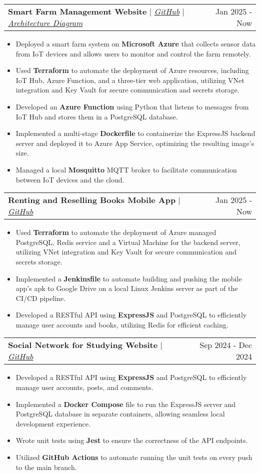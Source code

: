 \documentclass[letterpaper,11pt]{article}
\makeatletter
\newcommand{\resumeItem}[1]{
  \item\small{
    {#1 \vspace{-2pt}}
  }
}
\newcommand{\resumeProjectHeading}[2]{
    \vspace{-2pt}\item
    \begin{tabular*}{0.97\textwidth}{l@{\extracolsep{\fill}}r}
      #1 & \small#2 \\
    \end{tabular*}\vspace{-7pt}
}
\newcommand{\resumeItemListStart}{\begin{itemize}}
\newcommand{\resumeItemListEnd}{\end{itemize}\vspace{-5pt}}
\makeatother
\begin{document}
      \resumeProjectHeading
        {\textbf{Smart Farm Management Website} $|$ \emph{\href{https://github.com/kng1259/IOT-project}{GitHub}} $|$ \emph{\href{https://drive.google.com/file/d/1R50MEnKQcrV0OXfp1K20jsz2jnyDsDmk/view?usp=sharing}{Architecture Diagram}}}{Jan 2025 - Now}
          \resumeItemListStart
            \resumeItem{Deployed a smart farm system on \textbf{Microsoft Azure} that collects sensor data from IoT devices and allows users to monitor and control the farm remotely.}
            \resumeItem{Used \textbf{Terraform} to automate the deployment of Azure resources, including IoT Hub, Azure Function, and a three-tier web application, utilizing VNet integration and Key Vault for secure communication and secrets storage.}
            \resumeItem{Developed an \textbf{Azure Function} using Python that listens to messages from IoT Hub and stores them in a PostgreSQL database.}
            \resumeItem{Implemented a multi-stage \textbf{Dockerfile} to containerize the ExpressJS backend server and deployed it to Azure App Service, optimizing the resulting image's size.}
            \resumeItem{Managed a local \textbf{Mosquitto} MQTT broker to facilitate communication between IoT devices and the cloud.}
          \resumeItemListEnd
      
      \resumeProjectHeading
        {\textbf{Renting and Reselling Books Mobile App} $|$ \emph{\href{https://github.com/btram11/Mobile-242}{GitHub}}}{Jan 2025 - Now}
          \resumeItemListStart
            \resumeItem{Used \textbf{Terraform} to automate the deployment of Azure managed PostgreSQL, Redis service and a Virtual Machine for the backend server, utilizing VNet integration and Key Vault for secure communication and secrets storage.}
            \resumeItem{Implemented a \textbf{Jenkinsfile} to automate building and pushing the mobile app's apk to Google Drive on a local Linux Jenkins server as part of the CI/CD pipeline.}
            \resumeItem{Developed a {RESTful API} using \textbf{ExpressJS} and PostgreSQL to efficiently manage user accounts and books, utilizing Redis for efficient caching.}
          \resumeItemListEnd

      \resumeProjectHeading
        {\textbf{Social Network for Studying Website} $|$ \emph{\href{https://github.com/NguyenVu04/Do_An}{GitHub}}}{Sep 2024 - Dec 2024}
          \resumeItemListStart
            \resumeItem{Developed a {RESTful API} using \textbf{ExpressJS} and PostgreSQL to efficiently manage user accounts, posts, and comments.}
            \resumeItem{Implemented a \textbf{Docker Compose} file to run the ExpressJS server and PostgreSQL database in separate containers, allowing seamless local development experience.}
            \resumeItem{Wrote unit tests using \textbf{Jest} to ensure the correctness of the API endpoints.}
            \resumeItem{Utilized \textbf{GitHub Actions} to automate running the unit tests on every push to the main branch.}
          \resumeItemListEnd
      
\end{document}
